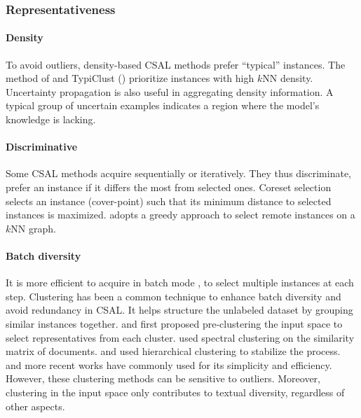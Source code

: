 \subsubsection{Representativeness}
\label{subsubsec:repr}

\paragraph{Density}
To avoid outliers, density-based CSAL methods prefer ``typical'' instances.
The method of \citet{zhu-etal-2008-active} and TypiClust (\citealp{pmlr-v162-hacohen22a}) prioritize instances with high $k$NN density.
Uncertainty propagation \citep{yu-etal-2023-cold} is also useful in aggregating density information.
A typical group of uncertain examples indicates a region where the model's knowledge is lacking.

\paragraph{Discriminative}
Some CSAL methods acquire sequentially or iteratively.
They thus discriminate, \ie{} prefer an instance if it differs the most from selected ones.
Coreset selection \citep{sener2018active} selects an instance (cover-point) such that its minimum distance to selected instances is maximized.
\votek{} \citep{su2023selective} adopts a greedy approach to select remote instances on a $k$NN graph.

\paragraph{Batch diversity}
It is more efficient to acquire in batch mode \citep{settles.tr09}, \ie{} to select multiple instances at each step.
Clustering has been a common technique to enhance batch diversity and avoid redundancy in CSAL.
It helps structure the unlabeled dataset by grouping similar instances together.
\citet{10.1145/1015330.1015349} and \citet{10.1007/978-3-540-24775-3_46} first proposed \mbox{pre-clustering} the input space to select representatives from each cluster. %
\citet{dasgupta-ng-2009-mine} used spectral clustering on the similarity matrix of documents.
\citet{hu2010off} and \citet{8443399} used hierarchical clustering to stabilize the process.
\citet{zhu-etal-2008-active} and more recent works \citep{yuan-etal-2020-cold,chang-etal-2021-training,agarwal2021addressing,10.1007/978-3-031-08473-7_9,pmlr-v162-hacohen22a,yu-etal-2023-cold} have commonly used \kmeans{} for its simplicity and efficiency.
However, these clustering methods can be sensitive to outliers.
Moreover, clustering in the input space only contributes to textual diversity, regardless of other aspects.%

